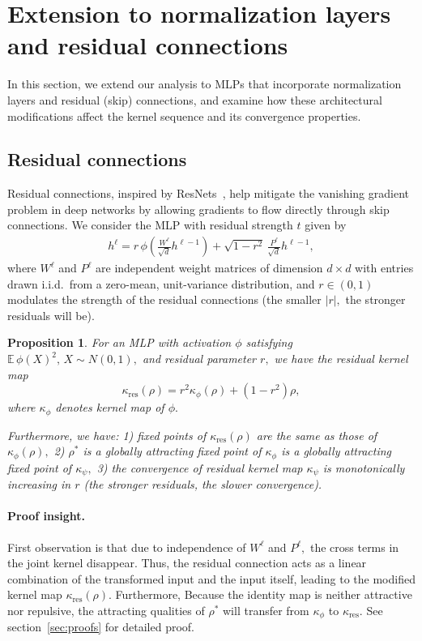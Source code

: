 \documentclass[twoside]{article}
\newcommand{\res}{\text{res}}
\newcommand{\E}{\mathbb{E}\,}
\newtheorem{proposition}{Proposition}
\theoremstyle{definition}
\begin{document}
\section{Extension to normalization layers and residual connections}

In this section, we extend our analysis to MLPs that incorporate normalization layers and residual (skip) connections, and examine how these architectural modifications affect the kernel sequence and its convergence properties.


\subsection{Residual connections}

Residual connections, inspired by ResNets~\citep{he2016deep}, help mitigate the vanishing gradient problem in deep networks by allowing gradients to flow directly through skip connections. We consider the MLP with residual strength $t$ given by
\begin{align*}
h^\ell = r \, \phi\left( \frac{W^\ell}{\sqrt{d}}  h^{\ell-1} \right) + \sqrt{1-r^2}\, \frac{P^\ell}{\sqrt{d}}  h^{\ell-1},
\end{align*}
where $W^\ell$ and $P^\ell$ are independent weight matrices of dimension $d \times d$ with entries drawn i.i.d.~from a zero-mean, unit-variance distribution, and $r \in (0, 1)$ modulates the strength of the residual connections (the smaller $|r|,$ the stronger residuals will be).


\begin{proposition}
\label{prop:residual_kernel_map}
For an MLP with activation $\phi$ satisfying $\E\phi(X)^2,\,X\sim N(0,1),$ and residual parameter $r,$ we have the residual kernel map
\begin{equation}
\kappa_\res(\rho) = r^2 \kappa_\phi(\rho) + (1-r^2) \rho,
\end{equation}
where $\kappa_\phi$ denotes kernel map of $\phi.$

Furthermore, we have: 1) fixed points of $\kappa_\res(\rho)$ are the same as those of $\kappa_\phi(\rho),$ 2)  $\rho^*$ is a globally attracting fixed point of  $\kappa_\phi$ is a globally attracting fixed point of $\kappa_\psi,$ 3) the convergence of residual kernel map $\kappa_\psi$ is monotonically increasing in $r$ (the stronger residuals, the slower convergence). 
\end{proposition}



\paragraph{Proof insight.} First observation is that due to independence of $W^\ell$ and $P^\ell,$ the cross terms in the joint kernel disappear. Thus, the residual connection acts as a linear combination of the transformed input and the input itself, leading to the modified kernel map $\kappa_\res(\rho)$. Furthermore, Because the identity map is neither attractive nor repulsive, the attracting qualities of $\rho^*$ will transfer from $\kappa_\phi$ to $\kappa_\res.$ See section~\ref{sec:proofs} for detailed proof.
\end{document}
